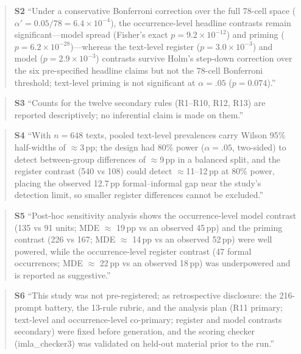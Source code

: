 \documentclass[11pt]{article}
\begin{document}
\begin{quote}\small
\textbf{S2} ``Under a conservative Bonferroni correction over the full 78-cell space ($\alpha' = 0.05/78 = 6.4\times10^{-4}$), the occurrence-level headline contrasts remain significant---model spread (Fisher's exact $p = 9.2\times10^{-12}$) and priming ($p = 6.2\times10^{-28}$)---whereas the text-level register ($p = 3.0\times10^{-3}$) and model ($p = 2.9\times10^{-3}$) contrasts survive Holm's step-down correction over the six pre-specified headline claims but not the 78-cell Bonferroni threshold; text-level priming is not significant at $\alpha = .05$ ($p = 0.074$).''
\end{quote}

\begin{quote}\small
\textbf{S3} ``Counts for the twelve secondary rules (R1--R10, R12, R13) are reported descriptively; no inferential claim is made on them.''
\end{quote}

\begin{quote}\small
\textbf{S4} ``With $n = 648$ texts, pooled text-level prevalences carry Wilson 95\% half-widths of $\approx$3\,pp; the design had 80\% power ($\alpha = .05$, two-sided) to detect between-group differences of $\approx$9\,pp in a balanced split, and the register contrast (540 vs 108) could detect $\approx$11--12\,pp at 80\% power, placing the observed 12.7\,pp formal--informal gap near the study's detection limit, so smaller register differences cannot be excluded.''
\end{quote}

\begin{quote}\small
\textbf{S5} ``Post-hoc sensitivity analysis shows the occurrence-level model contrast (135 vs 91 units; MDE $\approx$ 19\,pp vs an observed 45\,pp) and the priming contrast (226 vs 167; MDE $\approx$ 14\,pp vs an observed 52\,pp) were well powered, while the occurrence-level register contrast (47 formal occurrences; MDE $\approx$ 22\,pp vs an observed 18\,pp) was underpowered and is reported as suggestive.''
\end{quote}

\begin{quote}\small
\textbf{S6} ``This study was not pre-registered; as retrospective disclosure: the 216-prompt battery, the 13-rule rubric, and the analysis plan (R11 primary; text-level and occurrence-level co-primary; register and model contrasts secondary) were fixed before generation, and the scoring checker (imla\_checker3) was validated on held-out material prior to the run.''
\end{quote}
\end{document}
